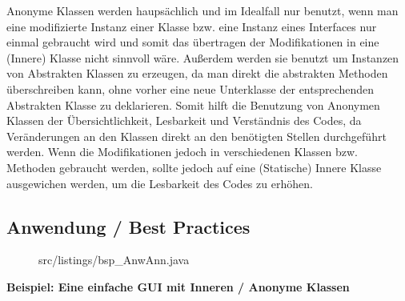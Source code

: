 Anonyme Klassen werden haupsächlich und im Idealfall nur benutzt, wenn man eine modifizierte Instanz einer Klasse bzw. eine Instanz eines Interfaces nur einmal gebraucht wird und somit das übertragen der Modifikationen in eine (Innere) Klasse nicht sinnvoll wäre.
Außerdem werden sie benutzt um Instanzen von Abstrakten Klassen zu erzeugen, da man direkt die abstrakten Methoden überschreiben kann, ohne vorher eine neue Unterklasse der entsprechenden Abstrakten Klasse zu deklarieren.
Somit hilft die Benutzung von Anonymen Klassen der Übersichtlichkeit, Lesbarkeit und Verständnis des Codes, da Veränderungen an den Klassen direkt an den benötigten Stellen durchgeführt werden.
Wenn die Modifikationen jedoch in verschiedenen Klassen bzw. Methoden gebraucht werden, sollte jedoch auf eine (Statische) Innere Klasse ausgewichen werden, um die Lesbarkeit des Codes zu erhöhen.

\subsection{Anwendung / Best Practices}


\begin{figure}[hb]
\lstset{language=Java}
 {src/listings/bsp_AnwAnn.java}
\end{figure}


{\bf Beispiel: Eine einfache GUI mit Inneren / Anonyme Klassen}

